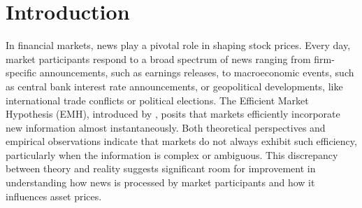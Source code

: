 \section{Introduction}
In financial markets, news play a pivotal role in shaping stock prices. Every day, market participants respond to a broad spectrum of news ranging from firm-specific announcements, such as earnings releases, to macroeconomic events, such as central bank interest rate announcements, or geopolitical developments, like international trade conflicts or political elections. The Efficient Market Hypothesis (EMH), introduced by \cite{fama1970efficient}, posits that markets efficiently incorporate new information almost instantaneously. Both theoretical perspectives and empirical observations indicate that markets do not always exhibit such efficiency, particularly when the information is complex or ambiguous. This discrepancy between theory and reality suggests significant room for improvement in understanding how news is processed by market participants and how it influences asset prices.

